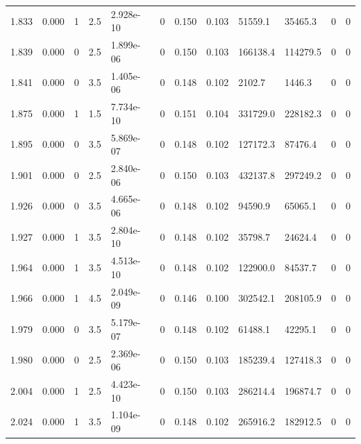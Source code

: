 \documentclass[preview]{standalone}
\begin{document}
{{{{\begin{tabular}{L{1.2cm}C{1.2cm} C{0.3cm}C{0.5cm} C{1.4cm}C{1.4cm} C{1.4cm}C{1.4cm} C{1.6cm}C{1.6cm} C{1.6cm}C{1.6cm}}
  1.833  &  0.000  & 1     & 2.5 &  2.928e-10  & 0  &  0.150&   0.103& 51559.1 & 35465.3   &  0 & 0  \\ 
  1.839  &  0.000  & 0     & 2.5 &  1.899e-06  & 0  &  0.150&   0.103& 166138.4 & 114279.5   &  0 & 0  \\ 
  1.841  &  0.000  & 0     & 3.5 &  1.405e-06  & 0  &  0.148&   0.102& 2102.7 & 1446.3   &  0 & 0  \\ 
  1.875  &  0.000  & 1     & 1.5 &  7.734e-10  & 0  &  0.151&   0.104& 331729.0 & 228182.3   &  0 & 0  \\ 
  1.895  &  0.000  & 0     & 3.5 &  5.869e-07  & 0  &  0.148&   0.102& 127172.3 & 87476.4   &  0 & 0  \\ 
  1.901  &  0.000  & 0     & 2.5 &  2.840e-06  & 0  &  0.150&   0.103& 432137.8 & 297249.2   &  0 & 0  \\ 
  1.926  &  0.000  & 0     & 3.5 &  4.665e-06  & 0  &  0.148&   0.102& 94590.9 & 65065.1   &  0 & 0  \\ 
  1.927  &  0.000  & 1     & 3.5 &  2.804e-10  & 0  &  0.148&   0.102& 35798.7 & 24624.4   &  0 & 0  \\ 
  1.964  &  0.000  & 1     & 3.5 &  4.513e-10  & 0  &  0.148&   0.102& 122900.0 & 84537.7   &  0 & 0  \\ 
  1.966  &  0.000  & 1     & 4.5 &  2.049e-09  & 0  &  0.146&   0.100& 302542.1 & 208105.9   &  0 & 0  \\ 
  1.979  &  0.000  & 0     & 3.5 &  5.179e-07  & 0  &  0.148&   0.102& 61488.1 & 42295.1   &  0 & 0  \\ 
  1.980  &  0.000  & 0     & 2.5 &  2.369e-06  & 0  &  0.150&   0.103& 185239.4 & 127418.3   &  0 & 0  \\ 
  2.004  &  0.000  & 1     & 2.5 &  4.423e-10  & 0  &  0.150&   0.103& 286214.4 & 196874.7   &  0 & 0  \\ 
  2.024  &  0.000  & 1     & 3.5 &  1.104e-09  & 0  &  0.148&   0.102& 265916.2 & 182912.5   &  0 & 0  \\ 
\hline 
\end{tabular} 

}}}}
\end{document}
